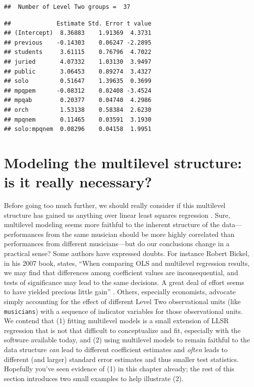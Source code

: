 \documentclass[
]{krantz}
\begin{document}
\begin{verbatim}
##  Number of Level Two groups =  37
\end{verbatim}

\begin{verbatim}
##             Estimate Std. Error t value
## (Intercept)  8.36883    1.91369  4.3731
## previous    -0.14303    0.06247 -2.2895
## students     3.61115    0.76796  4.7022
## juried       4.07332    1.03130  3.9497
## public       3.06453    0.89274  3.4327
## solo         0.51647    1.39635  0.3699
## mpqpem      -0.08312    0.02408 -3.4524
## mpqab        0.20377    0.04740  4.2986
## orch         1.53138    0.58384  2.6230
## mpqnem       0.11465    0.03591  3.1930
## solo:mpqnem  0.08296    0.04158  1.9951
\end{verbatim}

\hypertarget{multinecessary}{%
\section{Modeling the multilevel structure: is it really necessary?}\label{multinecessary}}

Before going too much further, we should really consider if this multilevel structure has gained us anything over linear least squares regression . Sure, multilevel modeling  seems more faithful to the inherent structure of the data---performances from the same musician should be more highly correlated than performances from different musicians---but do our conclusions change in a practical sense? Some authors have expressed doubts. For instance Robert Bickel, in his 2007 book, states, ``When comparing OLS and multilevel regression results, we may find that differences among coefficient values are inconsequential, and tests of significance may lead to the same decisions. A great deal of effort seems to have yielded precious little gain'' \citep{Bickel2007}. Others, especially economists, advocate simply accounting for the effect of different Level Two observational units (like \texttt{musicians}) with a sequence of indicator variables for those observational units. We contend that (1) fitting multilevel models is a small extension of LLSR regression that is not that difficult to conceptualize and fit, especially with the software available today, and (2) using multilevel models to remain faithful to the data structure \emph{can} lead to different coefficient estimates and \emph{often} leads to different (and larger) standard error estimates and thus smaller test statistics. Hopefully you've seen evidence of (1) in this chapter already; the rest of this section introduces two small examples to help illustrate (2).
\end{document}

